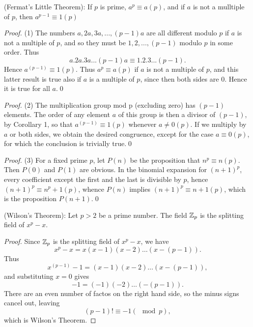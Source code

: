 \begin{theorem}{(Fermat's Little Theorem):}
If $p$ is prime, $a^p\equiv a(p)$, and if $a$ is not a mulltiple of $p$, then $a^{p-1} \equiv 1 (p)$ 
\end{theorem}

\begin{proof}
(1) The numbers $a, 2a, 3a, ..., (p-1)a$ are all different modulo $p$ if $a$ is not a multiple of $p$, and so they must be $1,2,...,(p-1)$ modulo $p$ in some order. Thus
$$ a.2a.3a ... (p-1)a \equiv 1.2.3 ... (p-1).$$
Hence $a^{(p-1)} \equiv 1(p)$. Thus $a^p \equiv a(p)$ if $a$ is not a multiple of $p$, and this latter result is true also if $a$ is a multiple of $p$, since then both sides are 0. Hence it is true for all $a$.\qed
\end{proof}

\begin{proof}
(2) The multiplication group mod p (excluding zero) has $(p-1)$ elements. The order of any element $a$ of this group is then a divisor of $(p-1)$, by Corollary 1, so that $a^{(p-1)}\equiv 1(p)$ whenever $a\ne 0(p)$. If we multiply by $a$ or both sides, we obtain the desired congruence, except for the case $a\equiv 0(p)$, for which the conclusion is trivially true.\qed
\end{proof}

\begin{proof}
(3) For a fixed prime $p$, let $P(n)$ be the proposition that $n^p \equiv n(p)$.  Then $P(0)$ and $P(1)$ are obvious. In the binomial expansion for $(n+1)^p$, every coefficient except the first and the last is divisible by $p$, hence $(n+1)^p \equiv n^p + 1 (p)$, whence $P(n)$ implies $(n+1)^p \equiv n + 1(p)$, which is the proposition $P(n+1)$.\qed
\end{proof}

\begin{theorem}{(Wilson's Theorem):}
Let $p>2$ be a prime number. The field $\mathbb{Z}_p$ is the splitting field of $x^p - x$.
\end{theorem}

\begin{proof}
Since $\mathbb{Z}_p$ is the splitting field of $x^p - x$, we have $$x^p - x = x(x-1)(x-2)\hdots (x-(p-1)).$$Thus $$x^{(p-1)} - 1 = (x-1)(x-2)\hdots(x- (p-1)),$$
and substituting $x=0$ gives 
$$-1 = (-1)(-2) \hdots (-(p-1)).$$
There are an even number of factos on the right hand side, so the minus signs cancel out, leaving
$$(p-1)! \equiv -1 (\mod{p}),$$ which is Wilson's Theorem.
\end{proof}


